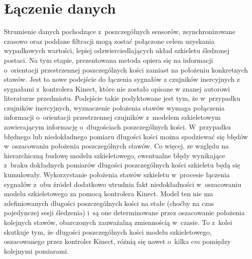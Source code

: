 \section{Łączenie danych}
										
Strumienie danych pochodzące z~poszczegółnych sensorów, zsynchronizowane czasowo oraz poddane filtracji mogą zostać połączone celem uzyskania wypadkowych wartości, lepiej odzwierciedlających układ szkieletu śledzonej postaci. Na tym etapie, prezentowana metoda opiera się na informacji o~orientacji przestrzennej poszczególnych kości zamiast na położeniu konkretnych stawów. Jest to nowe podejście do łączenia sygnałów z czujników inercyjnych z sygnałami z~kontrolera Kinect, które nie zostało opisane w znanej autorowi literaturze przedmiotu. Podejście takie podyktowane jest tym, że w~przypadku czujników inercyjnych, wyznaczenie położenia stawów wymaga połączenia informacji o~orientacji przestrzennej czujników z~modelem szkieletowym zawierającym informację o~długościach poszczególnych kości. W~przypadku błędnego lub niedokładnego pomiaru długości kości można spodziewać się błędów w~oszacowaniu położenia poszczególnych stawów. Co więcej, ze względu na hierarchiczną budowę modelu szkieletowego, ewentualne błędy wynikające z~braku dokładnych pomiarów długości poszczególnych kości szkieletu będą się kumulowały. 
Wykorzystanie położenia stawów szkieletu w~procesie łączenia sygnałów z~obu źródeł dodatkowo utrudnia fakt niedokładności w~oszacowaniu modelu szkieletowego za pomocą kontrolera Kinect. Model ten nie ma zdefiniowanych długości poszczególnych kości na stałe (choćby na czas pojedynczej sesji śledzenia) i~są one determinowane przez oszacowanie położenia kolejnych stawów, obarczonych zauważalną zmiennością w~czasie. To z~kolei skutkuje tym, że długości poszczególnych kości modelu szkieletowego, oszacowanego przez kontroler Kinect, różnią się nawet o~kilka $cm$ pomiędzy kolejnymi pomiarami.\\
										
